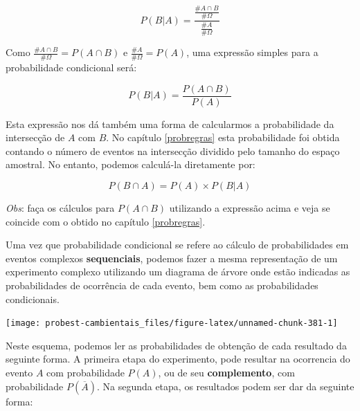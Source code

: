 \documentclass[
]{book}
\begin{document}
\[P(B|A) = \frac{\frac{\#A \cap B}{\#\Omega}}{\frac{\#A}{\#\Omega}}\]

Como \(\frac{\#A \cap B}{\#\Omega} = P(A \cap B)\) e \(\frac{\#A}{\#\Omega} = P(A)\), uma expressão simples para a probabilidade condicional será:

\[P(B|A) = \frac{P(A \cap B)}{P(A)}\]

Esta expressão nos dá também uma forma de calcularmos a probabilidade da intersecção de \(A\) com \(B\). No capítulo \ref{probregras} esta probabilidade foi obtida contando o número de eventos na intersecção dividido pelo tamanho do espaço amostral. No entanto, podemos calculá-la diretamente por:

\[P(B \cap A) = P(A) \times P(B|A)\]

\emph{Obs}: faça os cálculos para \(P(A \cap B)\) utilizando a expressão acima e veja se coincide com o obtido no capítulo \ref{probregras}.

Uma vez que probabilidade condicional se refere ao cálculo de probabilidades em eventos complexos \textbf{sequenciais}, podemos fazer a mesma representação de um experimento complexo utilizando um diagrama de árvore onde estão indicadas as probabilidades de ocorrência de cada evento, bem como as probabilidades condicionais.

\begin{center}\texttt{[image: probest-cambientais\_files/figure-latex/unnamed-chunk-381-1]} \end{center}

Neste esquema, podemos ler as probabilidades de obtenção de cada resultado da seguinte forma. A primeira etapa do experimento, pode resultar na ocorrencia do evento \(A\) com probabilidade \(P(A)\), ou de seu \textbf{complemento}, com probabilidade \(P(\overline{A})\). Na segunda etapa, os resultados podem ser dar da seguinte forma:
\end{document}
